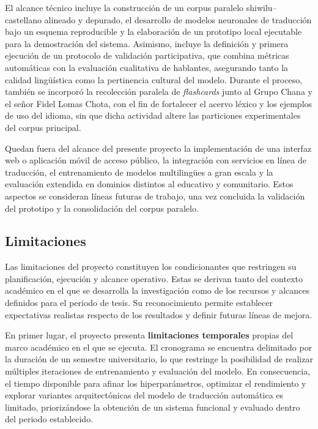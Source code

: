 \documentclass[12pt,a4paper,oneside]{book}
\begin{document}
El alcance técnico incluye la construcción de un corpus paralelo shiwilu--castellano alineado y depurado, el desarrollo de modelos neuronales de traducción bajo un esquema reproducible y la elaboración de un prototipo local ejecutable para la demostración del sistema. Asimismo, incluye la definición y primera ejecución de un protocolo de validación participativa, que combina métricas automáticas con la evaluación cualitativa de hablantes, asegurando tanto la calidad lingüística como la pertinencia cultural del modelo. Durante el proceso, también se incorporó la recolección paralela de \emph{flashcards} junto al Grupo Chana y el señor Fidel Lomas Chota, con el fin de fortalecer el acervo léxico y los ejemplos de uso del idioma, sin que dicha actividad altere las particiones experimentales del corpus principal.

Quedan fuera del alcance del presente proyecto la implementación de una interfaz web o aplicación móvil de acceso público, la integración con servicios en línea de traducción, el entrenamiento de modelos multilingües a gran escala y la evaluación extendida en dominios distintos al educativo y comunitario. Estos aspectos se consideran líneas futuras de trabajo, una vez concluida la validación del prototipo y la consolidación del corpus paralelo.

\subsection*{Limitaciones}

Las limitaciones del proyecto constituyen los condicionantes que restringen su planificación, ejecución y alcance operativo. Estas se derivan tanto del contexto académico en el que se desarrolla la investigación como de los recursos y alcances definidos para el periodo de tesis. Su reconocimiento permite establecer expectativas realistas respecto de los resultados y definir futuras líneas de mejora.

En primer lugar, el proyecto presenta \textbf{limitaciones temporales} propias del marco académico en el que se ejecuta. El cronograma se encuentra delimitado por la duración de un semestre universitario, lo que restringe la posibilidad de realizar múltiples iteraciones de entrenamiento y evaluación del modelo. En consecuencia, el tiempo disponible para afinar los hiperparámetros, optimizar el rendimiento y explorar variantes arquitectónicas del modelo de traducción automática es limitado, priorizándose la obtención de un sistema funcional y evaluado dentro del periodo establecido.
\end{document}
